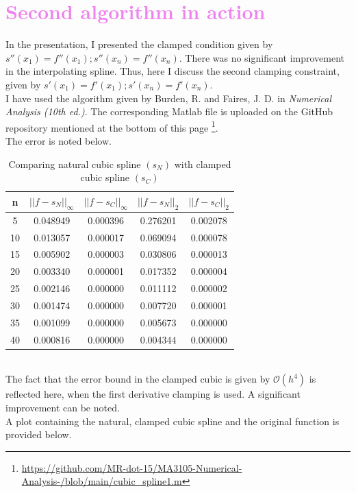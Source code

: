\documentclass[12pt]{article}
\begin{document}
\newpage
\section{\textcolor{violet}{Second algorithm in action}}
In the presentation, I presented the clamped condition given by $s''(x_1) = f''(x_1); s''(x_n) = f''(x_n)$. There was no significant improvement in the interpolating spline. Thus, here I discuss the second clamping constraint, given by $s'(x_1) = f'(x_1); s'(x_n) = f'(x_n)$.\\
I have used the algorithm given by Burden, R. and Faires, J. D. in \emph{Numerical Analysis (10th ed.)}. The corresponding Matlab file is uploaded on the GitHub repository mentioned at the bottom of this page  \footnote{\url{https://github.com/MR-dot-15/MA3105-Numerical-Analysis-/blob/main/cubic_spline1.m}}.\\
The error is noted below.
\begin{table}[h]
    \centering
    \begin{tabular}{|c|c|c|c|c|}
        \hline
        n & $||f-s_N||_\infty$ & $||f-s_C||_\infty$
        & $||f-s_N||_2$ & $||f-s_C||_2$\\
        \hline \hline
        5 & 0.048949 & 0.000396 & 0.276201 & 0.002078\\
        \hline
        10 & 0.013057 & 0.000017 & 0.069094 & 0.000078\\
        \hline
        15 & 0.005902 & 0.000003 & 0.030806 & 0.000013\\
        \hline
        20 & 0.003340 & 0.000001 & 0.017352 & 0.000004\\
        \hline
        25 & 0.002146 & 0.000000 & 0.011112 & 0.000002\\
        \hline
        30 & 0.001474 & 0.000000 & 0.007720 & 0.000001\\
        \hline
        35 & 0.001099 & 0.000000 & 0.005673 & 0.000000\\
        \hline
        40 & 0.000816 & 0.000000 & 0.004344 & 0.000000\\
        \hline
    \end{tabular}
    \caption{Comparing natural cubic spline $(s_N)$ with clamped cubic spline $(s_C)$}
\end{table}
\\The fact that the error bound in the clamped cubic is given by $\mathcal{O}(h^4)$ is reflected here, when the first derivative clamping is used. A significant improvement can be noted.\\
A plot containing the natural, clamped cubic spline and the original function is provided below.
\end{document}
